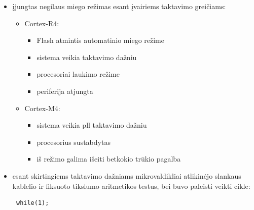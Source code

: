 \documentclass[a4paper, 12pt]{article} %
\begin{document}
\begin{onehalfspacing}
\begin{itemize}
\begin{itemize}
\item Cortex-M4:
\begin{itemize}
\item vidinis 1.2V \k{i}tampos reguliatorius i\v{s}jungtas
\item Pll\footnote{PLL - phase lock loop da\v{z}ni\k{u} generatorius}, vidinis 16MHz ir i\v{s}orinis 8MHz taktiniai osciliatoriai atjungti. Veikia vidinis 32kHz taktinis osciliatorius
\item procesorius sustabdytas
\item mikrovaldiklis minimalioje srov\.es suvartojimo b\=usenoje.
\item re\v{z}im\k{a} galima i\v{s}eiti:
\begin{itemize} 
\item gavus i\v{s}orin\k{i} impuls\k{a} \k{i} NRST arba WKUP i\v{s}vadus 
\item realaus laiko laikrod\v{z}iui $($RTC$)$ sugeneravus tr\=uk\k{i}
\end{itemize} 
\end{itemize}
\end{itemize}
\item \k{i}jungtas negilaus miego re\v{z}imas esant \k{i}vairiems taktavimo grei\v{c}iams:
\begin{itemize} %
\item Cortex-R4:
\begin{itemize}
\item Flash atmintis automatinio miego re\v{z}ime
\item sistema veikia taktavimo da\v{z}niu
\item procesoriai laukimo re\v{z}ime
\item periferija atjungta
\end{itemize}
\item Cortex-M4:
\begin{itemize}
\item sistema veikia pll taktavimo da\v{z}niu
\item procesorius sustabdytas 
\item i\v{s} re\v{z}imo galima i\v{s}eiti betkokio tr\=ukio pagalba
\end{itemize}
\end{itemize}
\item esant skirtingiems taktavimo da\v{z}niams mikrovaldikliai atlikin\.ejo slankaus kablelio ir fiksuoto tikslumo aritmetikos testus, bei buvo paleisti veikti cikle: \begin{verbatim} while(1); \end{verbatim} 
\end{itemize}

\end{onehalfspacing}
\end{document}
